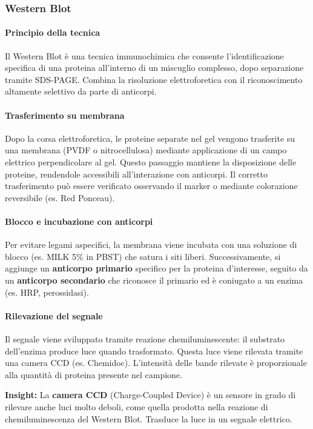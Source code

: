 \subsubsection{Western Blot}

\paragraph{Principio della tecnica}
Il Western Blot è una tecnica immunochimica che consente l’identificazione specifica di una proteina all’interno di un miscuglio complesso, dopo separazione tramite SDS-PAGE. Combina la risoluzione elettroforetica con il riconoscimento altamente selettivo da parte di anticorpi.

\paragraph{Trasferimento su membrana}
Dopo la corsa elettroforetica, le proteine separate nel gel vengono trasferite su una membrana (PVDF o nitrocellulosa) mediante applicazione di un campo elettrico perpendicolare al gel. Questo passaggio mantiene la disposizione delle proteine, rendendole accessibili all’interazione con anticorpi. Il corretto trasferimento può essere verificato osservando il marker o mediante colorazione reversibile (es. Red Ponceau).

\paragraph{Blocco e incubazione con anticorpi}
Per evitare legami aspecifici, la membrana viene incubata con una soluzione di blocco (es. MILK 5\% in PBST) che satura i siti liberi. Successivamente, si aggiunge un \textbf{anticorpo primario} specifico per la proteina d'interesse, seguito da un \textbf{anticorpo secondario} che riconosce il primario ed è coniugato a un enzima (es. HRP, perossidasi).

\paragraph{Rilevazione del segnale}
Il segnale viene sviluppato tramite reazione chemiluminescente: il substrato dell’enzima produce luce quando trasformato. Questa luce viene rilevata tramite una camera CCD (es. Chemidoc). L’intensità delle bande rilevate è proporzionale alla quantità di proteina presente nel campione.

\begin{insightBox}
	\textbf{Insight:} La \textbf{camera CCD} (Charge-Coupled Device) è un sensore in grado di rilevare anche luci molto deboli, come quella prodotta nella reazione di chemiluminescenza del Western Blot. 
	Trasduce la luce in un segnale elettrico.
\end{insightBox}

